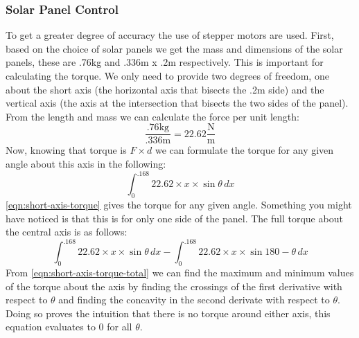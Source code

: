 \subsubsection{Solar Panel Control}
To get a greater degree of accuracy the use of stepper motors are used. First, based on the choice of solar panels we get the mass and dimensions of the solar panels, these are .76kg and .336m x .2m respectively. This is important for calculating the torque. We only need to provide two degrees of freedom, one about the short axis (the horizontal axis that bisects the .2m side) and the vertical axis (the axis at the intersection that bisects the two sides of the panel). From the length and mass we can calculate the force per unit length:
\begin{equation}
    \frac{.76 \text{kg}}{.336 \text{m}}=22.62\frac{\text{N}}{\text{m}}
    \label{eqn:short-axis-fpl}
\end{equation}
Now, knowing that torque is $F\times d$ we can formulate the torque for any given angle about this axis in the following:
\begin{equation}
    \int_{0}^{.168} 22.62 \times x \times \sin{\theta} \, dx
    \label{eqn:short-axis-torque}
\end{equation}
\autoref{eqn:short-axis-torque} gives the torque for any given angle. Something you might have noticed is that this is for only one side of the panel. The full torque about the central axis is as follows:
\begin{equation}
    \int_{0}^{.168} 22.62 \times x \times \sin{\theta} \, dx - \int_{0}^{.168} 22.62 \times x \times \sin{180-\theta} \, dx
    \label{eqn:short-axis-torque-total}
\end{equation}
From \autoref{eqn:short-axis-torque-total} we can find the maximum and minimum values of the torque about the axis by finding the crossings of the first derivative with respect to $\theta$ and finding the concavity in the second derivate with respect to $\theta$. Doing so proves the intuition that there is no torque around either axis, this equation evaluates to 0 for all $\theta$.

